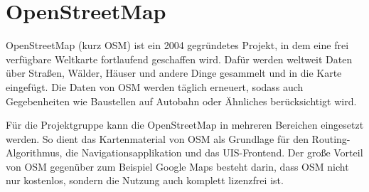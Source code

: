 \section{OpenStreetMap}
OpenStreetMap (kurz OSM) ist ein 2004 gegründetes Projekt, in dem eine frei verfügbare Weltkarte fortlaufend geschaffen wird. Dafür werden weltweit Daten über Straßen, Wälder, Häuser und andere Dinge gesammelt und in die Karte eingefügt. Die Daten von OSM werden täglich erneuert, sodass auch Gegebenheiten wie Baustellen auf Autobahn oder Ähnliches berücksichtigt wird.

Für die Projektgruppe kann die OpenStreetMap in mehreren Bereichen eingesetzt werden. So dient das Kartenmaterial von OSM als Grundlage für den Routing-Algorithmus, die Navigationsapplikation und das UIS-Frontend. Der große Vorteil von OSM gegenüber zum Beispiel Google Maps besteht darin, dass OSM nicht nur kostenlos, sondern die Nutzung auch komplett lizenzfrei ist\cite{OpenStreetMapFAQ}.
